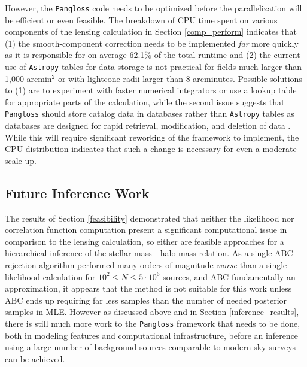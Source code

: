 \documentclass[%
 reprint,
 amsmath,amssymb,
 aps,nofootinbib
]{revtex4-1}
\begin{document}
However, the \texttt{Pangloss} code needs to be optimized before the parallelization will be efficient or even feasible. The breakdown of CPU time spent on various components of the lensing calculation in Section \ref{comp_perform} indicates that (1) the smooth-component correction needs to be implemented \textit{far} more quickly as it is responsible for on average 62.1\% of the total runtime and (2) the current use of \texttt{Astropy} tables for data storage is not practical for fields much larger than 1,000 arcmin$^2$ or with lightcone radii larger than 8 arcminutes. Possible solutions to (1) are to experiment with faster numerical integrators or use a lookup table for appropriate parts of the calculation, while the second issue suggests that \texttt{Pangloss} should store catalog data in databases rather than \texttt{Astropy} tables as databases are designed for rapid retrieval, modification, and deletion of data \cite{databases}. While this will require significant reworking of the framework to implement, the CPU distribution indicates that such a change is necessary for even a moderate scale up.

\subsection{Future Inference Work}

The results of Section \ref{feasibility} demonstrated that neither the likelihood nor correlation function computation present a significant computational issue in comparison to the lensing calculation, so either are feasible approaches for a hierarchical inference of the stellar mass - halo mass relation. As a single ABC rejection algorithm performed many orders of magnitude \textit{worse} than a single likelihood calculation for ${10^2\leq N\leq5\cdot10^6}$ sources, and ABC fundamentally an approximation, it appears that the method is not suitable for this work unless ABC ends up requiring far less samples than the number of needed posterior samples in MLE. However as discussed above and in Section \ref{inference_results}, there is still much more work to the \texttt{Pangloss} framework that needs to be done, both in modeling features and computational infrastructure, before an inference using a large number of background sources comparable to modern sky surveys can be achieved.


\end{document}
